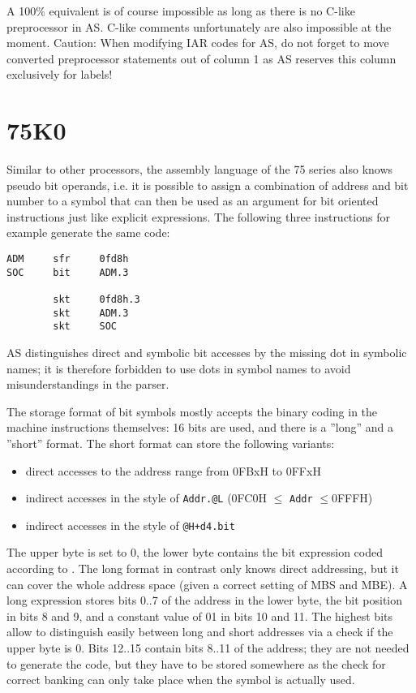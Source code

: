 \documentclass[12pt,twoside]{report}
\newcommand{\tty}[1]{{\tt #1}}
\begin{document}
A 100\% equivalent is of course impossible as long as there is no C-like
preprocessor in AS.  C-like comments unfortunately are also impossible
at the moment.  Caution: When modifying IAR codes for AS, do not forget to
move converted preprocessor statements out of column 1 as AS reserves this
column exclusively for labels!


\section{75K0}
\label{75K0Spec}

Similar to other processors, the assembly language of the 75 series
also knows pseudo bit operands, i.e. it is possible to assign a
combination of address and bit number to a symbol that can then be
used as an argument for bit oriented instructions just like explicit
expressions.  The following three instructions for example generate
the same code:
\begin{verbatim}
ADM     sfr     0fd8h
SOC     bit     ADM.3

        skt     0fd8h.3
        skt     ADM.3
        skt     SOC
\end{verbatim}
AS distinguishes direct and symbolic bit accesses by the missing dot
in symbolic names; it is therefore forbidden to use dots in symbol
names to avoid misunderstandings in the parser.

The storage format of bit symbols mostly accepts the binary coding in
the machine instructions themselves:  16 bits are used, and there is
a ''long'' and a ''short'' format.  The short format can store the
following variants:
\begin{itemize}
\item{direct accesses to the address range from 0FBxH to 0FFxH}
\item{indirect accesses in the style of \tty{Addr.@L} (0FC0H $\leq$ \tty{Addr} $\leq$0FFFH)}
\item{indirect accesses in the style of \tty{@H+d4.bit}}
\end{itemize}
The upper byte is set to 0, the lower byte contains the bit
expression coded according to \cite{NEC75}.  The long format in contrast
only knows direct addressing, but it can cover the whole address space
(given a correct setting of MBS and MBE).  A long expression stores
bits 0..7 of the address in the lower byte, the bit position in bits
8 and 9, and a constant value of 01 in bits 10 and 11.  The highest
bits allow to distinguish easily between long and short addresses via
a check if the upper byte is 0.  Bits 12..15 contain bits 8..11 of
the address; they are not needed to generate the code, but they have
to be stored somewhere as the check for correct banking can only
take place when the symbol is actually used.
\end{document}
